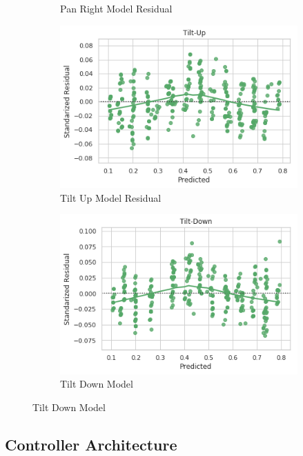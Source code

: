 \documentclass{l4proj}
\begin{document}
\begin{figure}[H]
\begin{subfigure}[b]{0.5\textwidth}
    \caption{Pan Right Model Residual}
    \label{panrightmodelres}
  \end{subfigure}
  \begin{subfigure}[b]{0.5\textwidth}
    \includegraphics[width=\textwidth]{l4template-master/images/tilt_up_residual.png}
    \caption{Tilt Up Model Residual}
    \label{tiltupres}
  \end{subfigure}
  \begin{subfigure}[b]{0.5\textwidth}
    \includegraphics[width=\textwidth]{l4template-master/images/tilt_down_residual.png}
    \caption{Tilt Down Model}
    \label{tiltdownres}
  \end{subfigure}  
    
\end{figure}


\subsection{Controller Architecture}
\end{document}
